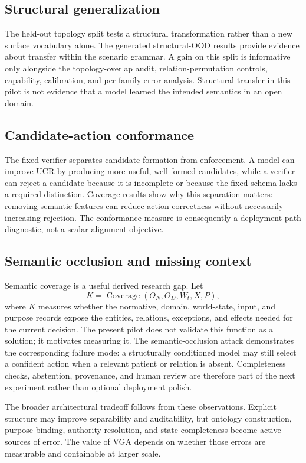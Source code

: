 \subsection{Structural generalization}

The held-out topology split tests a structural transformation rather than a new surface vocabulary alone. The generated structural-OOD results provide evidence about transfer within the scenario grammar. A gain on this split is informative only alongside the topology-overlap audit, relation-permutation controls, capability, calibration, and per-family error analysis. Structural transfer in this pilot is not evidence that a model learned the intended semantics in an open domain.

\subsection{Candidate-action conformance}

The fixed verifier separates candidate formation from enforcement. A model can improve UCR by producing more useful, well-formed candidates, while a verifier can reject a candidate because it is incomplete or because the fixed schema lacks a required distinction. Coverage results show why this separation matters: removing semantic features can reduce action correctness without necessarily increasing rejection. The conformance measure is consequently a deployment-path diagnostic, not a scalar alignment objective.

\subsection{Semantic occlusion and missing context}

Semantic coverage is a useful derived research gap. Let
\begin{equation}
  K = \operatorname{Coverage}(O_N,O_D,W_t,X,P),
  \label{eq:semantic-coverage}
\end{equation}
where $K$ measures whether the normative, domain, world-state, input, and purpose records expose the entities, relations, exceptions, and effects needed for the current decision. The present pilot does not validate this function as a solution; it motivates measuring it. The semantic-occlusion attack demonstrates the corresponding failure mode: a structurally conditioned model may still select a confident action when a relevant patient or relation is absent. Completeness checks, abstention, provenance, and human review are therefore part of the next experiment rather than optional deployment polish.

The broader architectural tradeoff follows from these observations. Explicit structure may improve separability and auditability, but ontology construction, purpose binding, authority resolution, and state completeness become active sources of error. The value of VGA depends on whether those errors are measurable and containable at larger scale.
